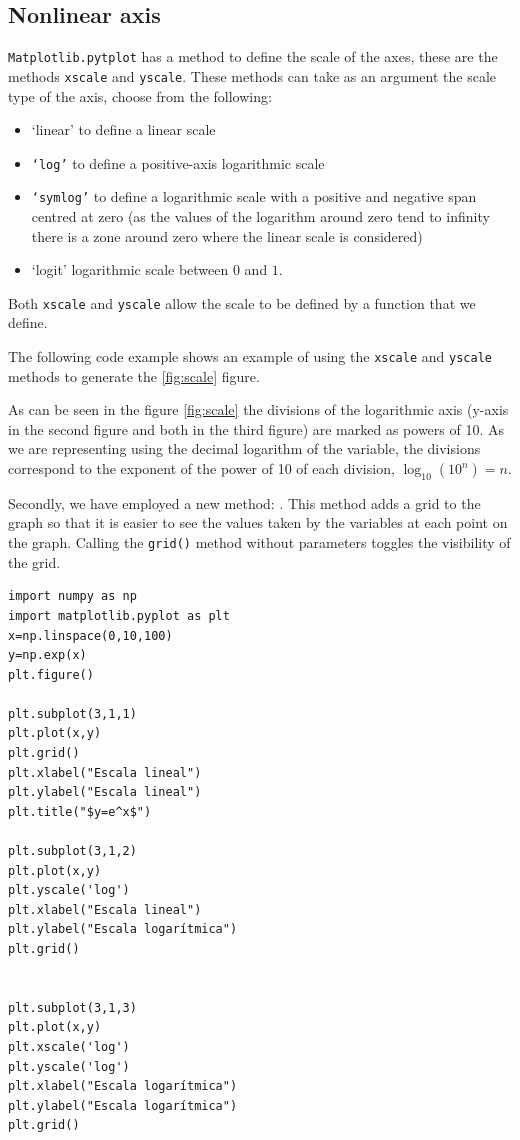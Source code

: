 \begin{paracol}{2}
    \subsection{Nonlinear axis}
    \texttt{Matplotlib.pytplot} has a method to define the scale of the axes, these are the methods \texttt{xscale} and \texttt{yscale}. These methods can take as an argument the scale type of the axis, choose from the following:
    \begin{itemize}
        \item ‘linear’ to define a linear scale
        \item \texttt{‘log’} to define a positive-axis logarithmic scale
        \item \texttt{‘symlog’} to define a logarithmic scale with a positive and negative span centred at zero (as the values of the logarithm around zero tend to infinity there is a zone around zero where the linear scale is considered)
        \item{‘logit’} logarithmic scale between $0$ and $1$.
    \end{itemize}
    Both \texttt{xscale} and \texttt{yscale} allow the scale to be defined by a function that we define.

    The following code example shows an example of using the \texttt{xscale} and \texttt{yscale} methods to generate the \ref{fig:scale} figure.  
    
    As can be seen in the figure \ref{fig:scale} the divisions of the logarithmic axis (y-axis in the second figure and both in the third figure) are marked as powers of 10. As we are representing using the decimal logarithm of the variable, the divisions correspond to the exponent of the power of 10 of each division, $\log_{10}(10^n)=n$.

    Secondly, we have employed a new method: . This method adds a grid to the graph so that it is easier to see the values taken by the variables at each point on the graph. Calling the \texttt{grid()} method without parameters toggles the visibility of the grid.
\end{paracol}
\begin{verbatim}
import numpy as np
import matplotlib.pyplot as plt
x=np.linspace(0,10,100)
y=np.exp(x)
plt.figure()

plt.subplot(3,1,1)
plt.plot(x,y)
plt.grid()
plt.xlabel("Escala lineal")
plt.ylabel("Escala lineal")
plt.title("$y=e^x$")

plt.subplot(3,1,2)  
plt.plot(x,y)
plt.yscale('log')
plt.xlabel("Escala lineal")
plt.ylabel("Escala logarítmica")
plt.grid()


plt.subplot(3,1,3)  
plt.plot(x,y)
plt.xscale('log')
plt.yscale('log')
plt.xlabel("Escala logarítmica")
plt.ylabel("Escala logarítmica")
plt.grid()

\end{verbatim}

